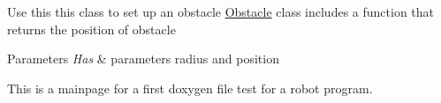 Use this this class to set up an obstacle \hyperlink{classObstacle}{Obstacle} class includes a function that returns the position of obstacle


\begin{DoxyParams}{Parameters}
{\em Has} & parameters radius and position\\
\hline
\end{DoxyParams}
This is a mainpage for a first doxygen file test for a robot program. 